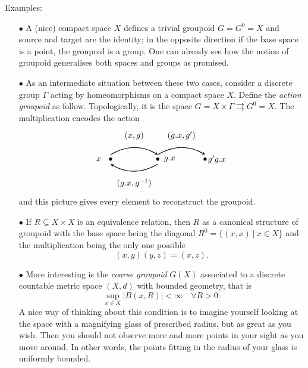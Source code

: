 Examples:
\begin{itemize}
\item[$\bullet$] A (nice) compact space $X$ defines a trivial groupoid $G=G^0=X$ and source and target are the identity; in the opposite direction if the base space is a point, the groupoid is a group. One can already see how the notion of groupoid generalises both spaces and groups as promised.  \\

\item[$\bullet$] As an intermediate situation between these two cases, consider a discrete group $\Gamma$ acting by homeomorphisms on a compact space $X$. Define the \textit{action groupoid} as follow. Topologically, it is the space $G= X\times \Gamma \rightrightarrows G^0 = X$. The multiplication encodes the action
\[\begin{tikzpicture}
\draw  (0,1) node {$(x,g)$};
\draw  (0,-1) node {$(g.x,g^{-1})$};
\draw  (2,1) node {$(g.x,g')$};
\draw [>=stealth, ->, thick] (-1,0.2) to[bend left] (1,0.2);
\draw [>=stealth, ->,thick] (1,-0.2) to[bend left] (-1,-0.2);
\draw [>=stealth, ->, thick] (1,0.2) to[bend left] (3,0.2);
\draw  (-1,0) node {$\bullet$};
\draw  (-1.5,0) node {$x$};
\draw  (1,0) node {$\bullet$};
\draw  (1.5,0) node {$g.x$};
\draw  (3,0) node {$\bullet$};
\draw  (3.5,0) node {$g'g.x$};
\end{tikzpicture}\]
and this picture gives every element to reconstruct the groupoid.\\

\item[$\bullet$] If $R\subseteq X\times X $ is an equivalence relation, then $R$ as a canonical structure of groupoid with the base space being the diagonal $R^0 = \{ (x,x) \ | \ x\in X\}$ and the multiplication being the only one possible
\[(x,y)(y,z) = (x,z).\] 

\item[$\bullet$] More interesting is the \textit{coarse groupoid} $G(X)$ associated to a discrete countable metric space $(X,d)$ with bounded geometry, that is
\[\sup_{x\in X} |B(x,R)| < \infty \quad \forall R>0.\]
A nice way of thinking about this condition is to imagine yourself looking at the space with a magnifying glass of prescribed radius, but as great as you wish. Then you should not observe more and more points in your sight as you move around. In other words, the points fitting in the radius of your glass is uniformly bounded.\\


\end{itemize}
